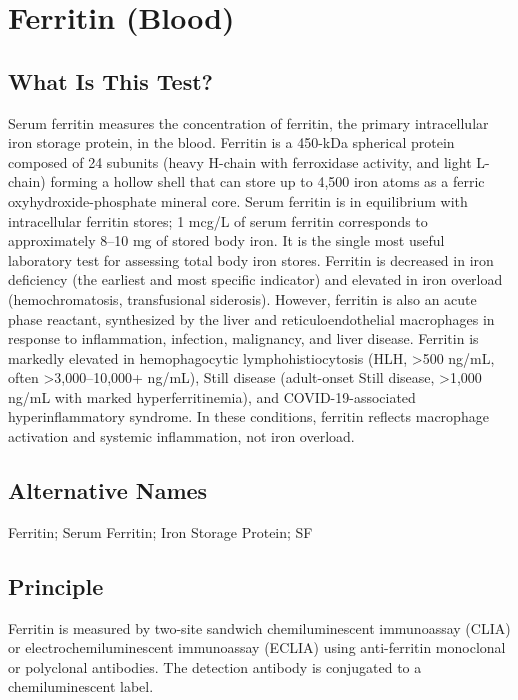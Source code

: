 \chapter{Ferritin (Blood)}
\section*{What Is This Test?}
Serum ferritin measures the concentration of ferritin, the primary intracellular iron storage protein, in the blood. Ferritin is a 450-kDa spherical protein composed of 24 subunits (heavy H-chain with ferroxidase activity, and light L-chain) forming a hollow shell that can store up to 4,500 iron atoms as a ferric oxyhydroxide-phosphate mineral core. Serum ferritin is in equilibrium with intracellular ferritin stores; 1 mcg/L of serum ferritin corresponds to approximately 8--10 mg of stored body iron. It is the single most useful laboratory test for assessing total body iron stores. Ferritin is decreased in iron deficiency (the earliest and most specific indicator) and elevated in iron overload (hemochromatosis, transfusional siderosis). However, ferritin is also an acute phase reactant, synthesized by the liver and reticuloendothelial macrophages in response to inflammation, infection, malignancy, and liver disease. Ferritin is markedly elevated in hemophagocytic lymphohistiocytosis (HLH, >500 ng/mL, often >3,000--10,000+ ng/mL), Still disease (adult-onset Still disease, >1,000 ng/mL with marked hyperferritinemia), and COVID-19-associated hyperinflammatory syndrome. In these conditions, ferritin reflects macrophage activation and systemic inflammation, not iron overload.
\section*{Alternative Names}
Ferritin; Serum Ferritin; Iron Storage Protein; SF
\section*{Principle}
Ferritin is measured by two-site sandwich chemiluminescent immunoassay (CLIA) or electrochemiluminescent immunoassay (ECLIA) using anti-ferritin monoclonal or polyclonal antibodies. The detection antibody is conjugated to a chemiluminescent label.
